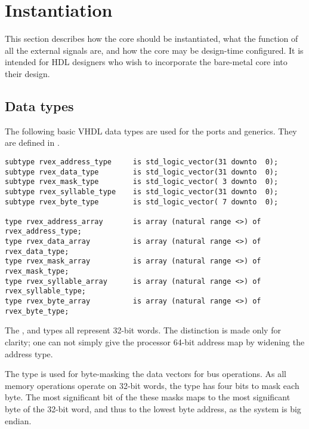 
\clearpage
\section{Instantiation}
\label{sec:core-ug-inst}

This section describes how the core should be instantiated, what the function of
all the external signals are, and how the core may be design-time configured. It
is intended for HDL designers who wish to incorporate the bare-metal core into
their design. 

\subsection{Data types}
\label{sec:core-ug-inst-types}

The following basic VHDL data types are used for the ports and generics. They
are defined in .

\begin{lstlisting}[numbers=none]
subtype rvex_address_type     is std_logic_vector(31 downto  0);
subtype rvex_data_type        is std_logic_vector(31 downto  0);
subtype rvex_mask_type        is std_logic_vector( 3 downto  0);
subtype rvex_syllable_type    is std_logic_vector(31 downto  0);
subtype rvex_byte_type        is std_logic_vector( 7 downto  0);

type rvex_address_array       is array (natural range <>) of rvex_address_type;
type rvex_data_array          is array (natural range <>) of rvex_data_type;
type rvex_mask_array          is array (natural range <>) of rvex_mask_type;
type rvex_syllable_array      is array (natural range <>) of rvex_syllable_type;
type rvex_byte_array          is array (natural range <>) of rvex_byte_type;
\end{lstlisting}

\noindent The ,  and  types all 
represent 32-bit words. The distinction is made only for clarity; one can not 
simply give the \rvex{} processor 64-bit address map by widening the address 
type.

The  type is used for byte-masking the data vectors for bus
operations. As all memory operations operate on 32-bit words, the 
type has four bits to mask each byte. The most significant bit of the these
masks maps to the most significant byte of the 32-bit word, and thus to the
lowest byte address, as the \rvex{} system is big endian.

